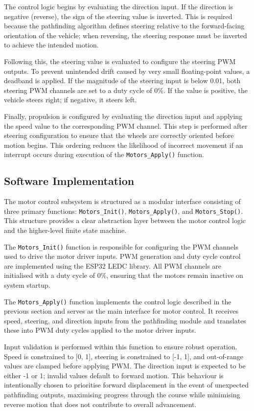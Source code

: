 The control logic begins by evaluating the direction input. If the direction is negative (reverse), the sign of the steering value is inverted. This is required because the pathfinding algorithm defines steering relative to the forward-facing orientation of the vehicle; when reversing, the steering response must be inverted to achieve the intended motion.

Following this, the steering value is evaluated to configure the steering PWM outputs. To prevent unintended drift caused by very small floating-point values, a deadband is applied. If the magnitude of the steering input is below 0.01, both steering PWM channels are set to a duty cycle of 0\%. If the value is positive, the vehicle steers right; if negative, it steers left.

Finally, propulsion is configured by evaluating the direction input and applying the speed value to the corresponding PWM channel. This step is performed after steering configuration to ensure that the wheels are correctly oriented before motion begins. This ordering reduces the likelihood of incorrect movement if an interrupt occurs during execution of the \texttt{Motors\_Apply()} function.

\subsection{Software Implementation}

The motor control subsystem is structured as a modular interface consisting of three primary functions: \texttt{Motors\_Init()}, \texttt{Motors\_Apply()}, and \texttt{Motors\_Stop()}. This structure provides a clear abstraction layer between the motor control logic and the higher-level finite state machine.

The \texttt{Motors\_Init()} function is responsible for configuring the PWM channels used to drive the motor driver inputs. PWM generation and duty cycle control are implemented using the ESP32 LEDC library. All PWM channels are initialised with a duty cycle of 0\%, ensuring that the motors remain inactive on system startup.

The \texttt{Motors\_Apply()} function implements the control logic described in the previous section and serves as the main interface for motor control. It receives speed, steering, and direction inputs from the pathfinding module and translates these into PWM duty cycles applied to the motor driver inputs.

Input validation is performed within this function to ensure robust operation. Speed is constrained to [0, 1], steering is constrained to [-1, 1], and out-of-range values are clamped before applying PWM. The direction input is expected to be either -1 or 1; invalid values default to forward motion. This behaviour is intentionally chosen to prioritise forward displacement in the event of unexpected pathfinding outputs, maximising progress through the course while minimising reverse motion that does not contribute to overall advancement.

